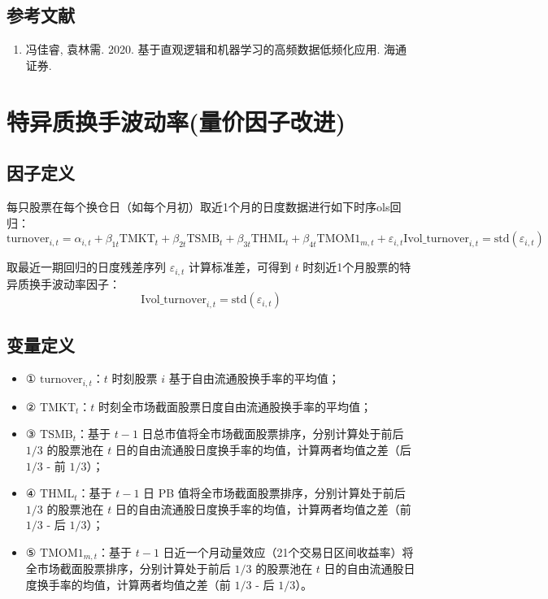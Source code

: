 \documentclass{article}
\begin{document}
\subsection{参考文献}
\begin{enumerate}
    \item 冯佳睿, 袁林需. 2020. 基于直观逻辑和机器学习的高频数据低频化应用. 海通证券.
\end{enumerate}

\section{特异质换手波动率(量价因子改进)}

\subsection{因子定义}
每只股票在每个换仓日（如每个月初）取近1个月的日度数据进行如下时序ols回归：
\begin{equation}
    \mathrm{turnover}_{i,t} = \alpha_{i,t} + \beta_{1t} \mathrm{TMKT}_t + \beta_{2t} \mathrm{TSMB}_t + \beta_{3t} \mathrm{THML}_t + \beta_{4t} \mathrm{TMOM1}_{m,t} + 
 
     \varepsilon_{i,t}\mathrm{Ivol\_turnover}_{i,t} = \mathrm{std}(\varepsilon_{i,t})
\end{equation}

取最近一期回归的日度残差序列 \( \varepsilon_{i,t} \) 计算标准差，可得到 \( t \) 时刻近1个月股票的特异质换手波动率因子：
\begin{equation}
    \mathrm{Ivol\_turnover}_{i,t} = \mathrm{std}(\varepsilon_{i,t})
\end{equation}

\subsection{变量定义}
\begin{itemize}
    \item ① \( \mathrm{turnover}_{i,t} \)：\( t \) 时刻股票 \( i \) 基于自由流通股换手率的平均值；
    \item ② \( \mathrm{TMKT}_t \)：\( t \) 时刻全市场截面股票日度自由流通股换手率的平均值；
    \item ③ \( \mathrm{TSMB}_t \)：基于 \( t-1 \) 日总市值将全市场截面股票排序，分别计算处于前后 \( 1/3 \) 的股票池在 \( t \) 日的自由流通股日度换手率的均值，计算两者均值之差（后 \( 1/3 \) - 前 \( 1/3 \)）；
    \item ④ \( \mathrm{THML}_t \)：基于 \( t-1 \) 日 PB 值将全市场截面股票排序，分别计算处于前后 \( 1/3 \) 的股票池在 \( t \) 日的自由流通股日度换手率的均值，计算两者均值之差（前 \( 1/3 \) - 后 \( 1/3 \)）；
    \item ⑤ \( \mathrm{TMOM1}_{m,t} \)：基于 \( t-1 \) 日近一个月动量效应（21个交易日区间收益率）将全市场截面股票排序，分别计算处于前后 \( 1/3 \) 的股票池在 \( t \) 日的自由流通股日度换手率的均值，计算两者均值之差（前 \( 1/3 \) - 后 \( 1/3 \)）。
\end{itemize}
\end{document}
